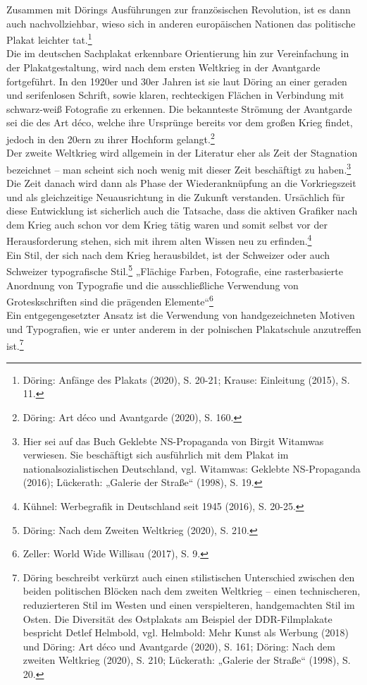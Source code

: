 \documentclass[a4paper,12pt,ngerman]{article}
\begin{document}
Zusammen mit Dörings Ausführungen zur französischen Revolution, ist es dann auch nachvollziehbar, wieso sich in anderen europäischen Nationen das politische Plakat leichter tat.\footnote{Döring: Anfänge des Plakats (2020), S. 20-21; Krause: Einleitung (2015), S. 11.} \\
Die im deutschen Sachplakat erkennbare Orientierung hin zur Vereinfachung in der Plakatgestaltung, wird nach dem ersten Weltkrieg in der Avantgarde fortgeführt. In den 1920er und 30er Jahren ist sie laut Döring an einer geraden und serifenlosen Schrift, sowie klaren, rechteckigen Flächen in Verbindung mit schwarz-weiß Fotografie zu erkennen. Die bekannteste Strömung der Avantgarde sei die des Art déco, welche ihre Ursprünge bereits vor dem großen Krieg findet, jedoch in den 20ern zu ihrer Hochform gelangt.\footnote{Döring: Art déco und Avantgarde (2020), S. 160.} \\
Der zweite Weltkrieg wird allgemein in der Literatur eher als Zeit der Stagnation bezeichnet -- man scheint sich noch wenig mit dieser Zeit beschäftigt zu haben.\footnote{Hier sei auf das Buch Geklebte NS-Propaganda von Birgit Witamwas verwiesen. Sie beschäftigt sich ausführlich mit dem Plakat im nationalsozialistischen Deutschland, vgl. Witamwas: Geklebte NS-Propaganda (2016); Lückerath: „Galerie der Straße“ (1998), S. 19.}  Die Zeit danach wird dann als Phase der Wiederanknüpfung an die Vorkriegszeit und als gleichzeitige Neuausrichtung in die Zukunft verstanden. Ursächlich für diese Entwicklung ist sicherlich auch die Tatsache, dass die aktiven Grafiker nach dem Krieg auch schon vor dem Krieg tätig waren und somit selbst vor der Herausforderung stehen, sich mit ihrem alten Wissen neu zu erfinden.\footnote{Kühnel: Werbegrafik in Deutschland seit 1945 (2016), S. 20-25.} \\
Ein Stil, der sich nach dem Krieg herausbildet, ist der Schweizer oder auch Schweizer typografische Stil.\footnote{Döring: Nach dem Zweiten Weltkrieg (2020), S. 210.}  „Flächige Farben, Fotografie, eine rasterbasierte Anordnung von Typografie und die ausschließliche Verwendung von Groteskschriften sind die prägenden Elemente“\footnote{Zeller: World Wide Willisau (2017), S. 9.} \\
Ein entgegengesetzter Ansatz ist die Verwendung von handgezeichneten Motiven und Typografien, wie er unter anderem in der polnischen Plakatschule anzutreffen ist.\footnote{Döring beschreibt verkürzt auch einen stilistischen Unterschied zwischen den beiden politischen Blöcken nach dem zweiten Weltkrieg -- einen technischeren, reduzierteren Stil im Westen und einen verspielteren, handgemachten Stil im Osten. Die Diversität des Ostplakats am Beispiel der DDR-Filmplakate bespricht Detlef Helmbold, vgl. Helmbold: Mehr Kunst als Werbung (2018) und Döring: Art déco und Avantgarde (2020), S. 161; Döring: Nach dem zweiten Weltkrieg (2020), S. 210; Lückerath: „Galerie der Straße“ (1998), S. 20.} \\
\end{document}
